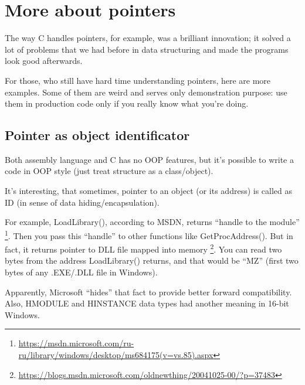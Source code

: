 \section{More about pointers}
\myindex{\CLanguageElements!\Pointers}
\label{label_pointers}

\epigraph{The way C handles pointers, for example, was a brilliant innovation;
it solved a lot of problems that we had before in data structuring and
made the programs look good afterwards.}
{}

For those, who still have hard time understanding \CCpp pointers, here are more examples.
Some of them are weird and serves only demonstration purpose:
use them in production code only if you really know what you're doing.








\subsection{Pointer as object identificator}

Both assembly language and C has no \ac{OOP} features, but it's possible to write a code in \ac{OOP} style (just treat
structure as a class/object).

It's interesting, that sometimes, pointer to an object (or its address) is called as ID
(in sense of data hiding/encapsulation).

For example, LoadLibrary(), according to \ac{MSDN}, returns ``handle to the module''
\footnote{\url{https://msdn.microsoft.com/ru-ru/library/windows/desktop/ms684175(v=vs.85).aspx}}.
Then you pass this ``handle'' to other functions like GetProcAddress().
But in fact, it returns pointer to DLL file mapped into memory
\footnote{\url{https://blogs.msdn.microsoft.com/oldnewthing/20041025-00/?p=37483}}.
You can read two bytes from the address LoadLibrary() returns, and that would be ``MZ'' (first two bytes of any
.EXE/.DLL file in Windows).

Apparently, Microsoft ``hides'' that fact to provide better forward compatibility.
Also, HMODULE and HINSTANCE data types had another meaning in 16-bit Windows.

